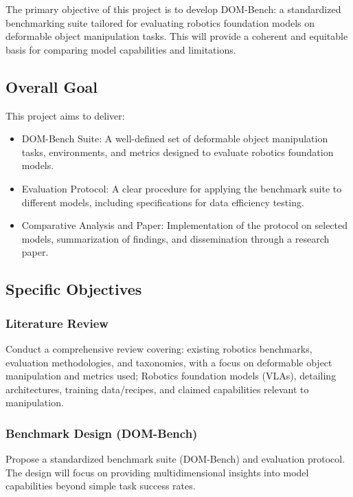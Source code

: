 The primary objective of this project is to develop DOM-Bench: a standardized benchmarking suite tailored for evaluating robotics foundation models on deformable object manipulation tasks. This will provide a coherent and equitable basis for comparing model capabilities and limitations.

\subsection{Overall Goal}

This project aims to deliver:
\begin{itemize}
    \item DOM-Bench Suite: A well-defined set of deformable object manipulation tasks, environments, and metrics designed to evaluate robotics foundation models.
    \item Evaluation Protocol: A clear procedure for applying the benchmark suite to different models, including specifications for data efficiency testing.
    \item Comparative Analysis and Paper: Implementation of the protocol on selected models, summarization of findings, and dissemination through a research paper.
\end{itemize}


\subsection{Specific Objectives}


\subsubsection{Literature Review} %
Conduct a comprehensive review covering: existing robotics benchmarks, evaluation methodologies, and taxonomies, with a focus on deformable object manipulation and metrics used; Robotics foundation models (VLAs), detailing architectures, training data/recipes, and claimed capabilities relevant to manipulation.

\subsubsection{Benchmark Design (DOM-Bench)}
Propose a standardized benchmark suite (DOM-Bench) and evaluation protocol. The design will focus on providing multidimensional insights into model capabilities beyond simple task success rates.

